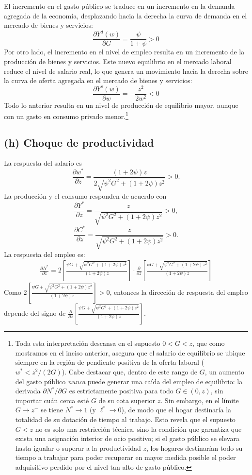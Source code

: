 \documentclass[11pt]{article}
\begin{document}
El incremento en el gasto público se traduce en un incremento en la demanda agregada de la economía, desplazando hacia la derecha la curva de demanda en el mercado de bienes y servicios:
$$
\frac{\partial Y^d(w)}{\partial G} = \frac{\psi}{1 + \psi} >0
$$
Por otro lado, el incremento en el nivel de empleo resulta en un incremento de la producción de bienes y servicios. Este nuevo equilibrio en el mercado laboral reduce el nivel de salario real, lo que genera un movimiento hacia la derecha sobre la curva de oferta agregada en el mercado de bienes y servicios:
$$
\frac{\partial Y^s(w)}{\partial w} = -\frac{z^2}{2w^2} <0
$$
Todo lo anterior resulta en un nivel de producción de equilibrio mayor, aunque con un gasto en consumo privado menor.\footnote{Toda esta interpretación descansa en el supuesto $0<G<z$, que como mostramos en el inciso anterior, asegura que el salario de equilibrio se ubique siempre en la región de pendiente positiva de la oferta laboral ($w^*<z^2/(2G)$). Cabe destacar que, dentro de este rango de $G$, un aumento del gasto público \textit{nunca} puede generar una caída del empleo de equilibrio: la derivada $\partial N^*/\partial G$ es estrictamente positiva para todo $G\in(0,z)$, sin importar cuán cerca esté $G$ de su cota superior $z$. Sin embargo, en el límite $G\to z^-$ se tiene $N^*\to1$ (y $\ell^*\to0$), de modo que el hogar destinaría la totalidad de su dotación de tiempo al trabajo. Esto revela que el supuesto $G<z$ no es solo una restricción técnica, sino la condición que garantiza que exista una asignación interior de ocio positivo; si el gasto público se elevara hasta igualar o superar a la productividad $z$, los hogares destinarían todo su tiempo a trabajar para poder recuperar en mayor medida posible el poder adquisitivo perdido por el nivel tan alto de gasto público.}

\subsection*{(h) Choque de productividad}

La respuesta del salario es
\[
  \boxed{
  \frac{\partial w^*}{\partial z}
  =\frac{(1+2\psi)z}
  {2\sqrt{\psi^2G^2+(1+2\psi)z^2}}>0
  }.
\]
La producción y el consumo responden de acuerdo con
\[
  \boxed{
  \frac{\partial Y^*}{\partial z}
  =\frac{z}{\sqrt{\psi^2G^2+(1+2\psi)z^2}}>0
  },
\]
\[
  \boxed{
  \frac{\partial C^*}{\partial z}
  =\frac{z}{\sqrt{\psi^2G^2+(1+2\psi)z^2}}>0
  }.
\]
La respuesta del empleo es:
\begin{align*}
  \frac{\partial N^*}{\partial z}
  = 2 \left[\frac{\psi G+\sqrt{\psi^2G^2+(1+2\psi)z^2}}{(1+2\psi)z}\right] \cdot \frac{\partial}{\partial z}\left[\frac{\psi G+\sqrt{\psi^2G^2+(1+2\psi)z^2}}{(1+2\psi)z}\right]
\end{align*}
Como $2 \left[\frac{\psi G+\sqrt{\psi^2G^2+(1+2\psi)z^2}}{(1+2\psi)z}\right] > 0$, entonces la dirección de respuesta del empleo depende del signo de $\frac{\partial}{\partial z}\left[\frac{\psi G+\sqrt{\psi^2G^2+(1+2\psi)z^2}}{(1+2\psi)z}\right]$.
\end{document}
